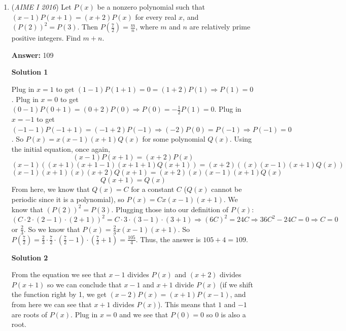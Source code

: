 \begin{enumerate}
 Note that $a \mid c_{k}^2 \iff a \mid d^2$. Since $a_{13}=2016$, we have $\frac{(a+6d)^2}{a}=2016$, let $k=a+6d$. This follows that
 \[a=\frac{k^2}{2016}\]Note that $2016=2^5\cdot 3^2\cdot 7$. Substituting $k=168m$, this follows that $a=14m^2$. Therefore
 \[6d=k-a=168m-14m^2\implies d=\frac{7}{3}m(12-m)\]$m$ needs to be a multiple of $3$, substituting $m=3j$, we find
 \[d=7j(12-3j)\]The cases for $j=1,2,3$ gives the solutions
 \[(a, d)=(126,63),(504,84),(1134,63)\]Note that only the second ordered-pair suffices $a \mid d^2$, the solution is hence $a_{1}=a=\boxed{504}$, as desired.

 


	\item (\textit{AIME I 2016}) Let $P(x)$ be a nonzero polynomial such that $(x-1)P(x+1)=(x+2)P(x)$ for every real $x$, and $\left(P(2)\right)^2 = P(3)$. Then $P(\frac72)=\frac{m}{n}$, where $m$ and $n$ are relatively prime positive integers. Find $m + n$.


 
 \textbf{Answer: }109



\textbf{Solution 1}

Plug in $x=1$ to get $(1-1)P(1+1) = 0 = (1+2)P(1) \Rightarrow P(1) = 0$. Plug in $x=0$ to get $(0-1)P(0+1) = (0+2)P(0)\Rightarrow P(0) = -\frac{1}{2}P(1) = 0$. Plug in $x=-1$ to get $(-1-1)P(-1+1) = (-1+2)P(-1)\Rightarrow (-2)P(0)=P(-1)\Rightarrow P(-1) = 0$. So $P(x) = x(x-1)(x+1)Q(x)$ for some polynomial $Q(x)$. Using the initial equation, once again, 
 \[(x-1)P(x+1) = (x+2)P(x)\]
 \[(x-1)((x+1)(x+1-1)(x+1+1)Q(x+1)) = (x+2)((x)(x-1)(x+1)Q(x))\]
 \[(x-1)(x+1)(x)(x+2)Q(x+1) = (x+2)(x)(x-1)(x+1)Q(x)\]
 \[Q(x+1) = Q(x)\]From here, we know that $Q(x) = C$ for a constant $C$ ($Q(x)$ cannot be periodic since it is a polynomial), so $P(x) = Cx(x-1)(x+1)$. We know that $\left(P(2)\right)^2 = P(3)$. Plugging those into our definition of $P(x)$: $(C \cdot 2 \cdot (2-1) \cdot (2+1))^2 = C \cdot 3 \cdot (3-1) \cdot (3+1) \Rightarrow (6C)^2 = 24C \Rightarrow 36C^2 - 24C = 0 \Rightarrow C = 0$ or $\frac{2}{3}$. So we know that $P(x) = \frac{2}{3}x(x-1)(x+1)$. So $P(\frac{7}{2}) = \frac{2}{3} \cdot \frac{7}{2} \cdot (\frac{7}{2} - 1) \cdot (\frac{7}{2} + 1) = \frac{105}{4}$. Thus, the answer is $105 + 4 = \boxed{109}$.

 



\textbf{Solution 2}

From the equation we see that $x-1$ divides $P(x)$ and $(x+2)$ divides $P(x+1)$ so we can conclude that $x-1$ and $x+1$ divide $P(x)$ (if we shift the function right by 1, we get $(x-2)P(x) = (x+1)P(x-1)$, and from here we can see that $x+1$ divides $P(x)$). This means that $1$ and $-1$ are roots of $P(x)$. Plug in $x = 0$ and we see that $P(0) = 0$ so $0$ is also a root. 


\end{enumerate}
